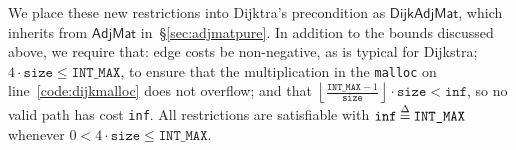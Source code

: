 We place these new restrictions into Dijktra's precondition as $\mathsf{DijkAdjMat}$, which inherits from $\mathsf{AdjMat}$ in~\S\ref{sec:adjmatpure}.
In addition to the bounds discussed above, we require that: edge costs be non-negative, as is typical for Dijkstra; $4 \cdot \texttt{size} \le \texttt{INT\_MAX}$, to ensure that the multiplication in the \texttt{malloc} on line~\ref{code:dijkmalloc} does not overflow; and that $\left\lfloor \frac{\texttt{INT\_MAX} - 1}{\texttt{size}}\right\rfloor \cdot \texttt{size} < \texttt{inf}$, so no valid path has cost \texttt{inf}.  All restrictions are satisfiable with $\texttt{inf} \mathbin{\stackrel{\Delta}{=}} \texttt{INT\_MAX}$ whenever $0 < 4 \cdot \texttt{size} \le \texttt{INT\_MAX}$.




